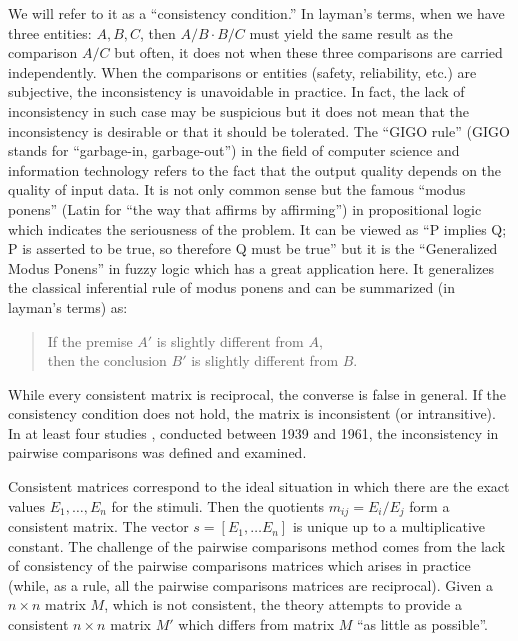 \documentclass [12pt]{article}
\theoremstyle{definition}
\begin{document}
We will refer to it as a ``consistency condition.'' In layman's terms, when we have three entities: $A, B, C$, then $A/B \cdot B/C$ must yield the same result as the comparison $A/C$ but often, it does not when these three comparisons are carried independently. When the comparisons or entities (safety, reliability, etc.) are subjective, the inconsistency is unavoidable in practice. In fact, the lack of inconsistency in such case may be suspicious but it does not mean that the inconsistency is desirable or that it should be tolerated. The ``GIGO rule'' (GIGO stands for ``garbage-in, garbage-out'')  in the field of computer science and information technology refers to the fact that the output quality depends on the quality of input data. It is not only common sense but the famous ``modus ponens'' (Latin for ``the way that affirms by affirming'') in propositional logic which indicates the seriousness of the problem. 
It can be viewed as ``P implies Q; P is asserted to be true, so therefore Q must be true'' but it is the ``Generalized Modus Ponens'' in fuzzy logic which has a great application here. It generalizes the classical inferential rule of modus ponens and can be summarized (in layman's terms) as:

\begin{quote}
If the premise $A'$ is slightly different from $A$, \\
then the conclusion $B'$ is slightly different from $B.$
\end{quote}


While every consistent matrix is reciprocal, the converse is false in general. If the consistency condition does not hold, the matrix is inconsistent (or intransitive). In at least four studies \cite{KSB1939, H1953, GS1958, S1961},  conducted between 1939 and 1961, the inconsistency in pairwise comparisons was defined and examined.
   
Consistent matrices correspond to the ideal situation in which there are the exact values $E_1, \ldots , E_n$ for the stimuli. 
Then the quotients $m_{ij}=E_i/E_j$ form a consistent matrix. 
The vector $s=[E_1, \ldots E_n]$ is unique up to a multiplicative constant. 
The challenge of the pairwise comparisons method comes from the lack of consistency of the pairwise comparisons matrices which arises in practice (while, as a rule, all the pairwise comparisons matrices are reciprocal). Given a $n \times n$ matrix $M$, which is not consistent, the theory attempts to provide a consistent $n \times n$ matrix $M'$ which differs from matrix $M$ ``as little as possible''. 
\end{document}
